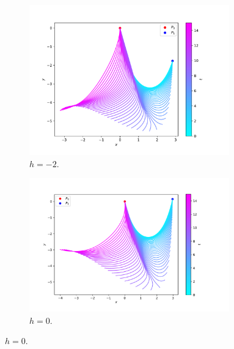 \documentclass[a4paper, 12pt, slovene]{article}
\numberwithin{equation}{section}
\begin{document}
\begin{figure}[H]
\centering
\begin{subfigure}{0.475\textwidth}
	\centering
	\includegraphics[width=0.95\textwidth]{grafi/falling_chain_P.3.0--2.0_L.6_n.50_t.15_r.0.0005_m.0.2_g.1_dt.0.01_freq.25.pdf}
	\caption{$h = -2$.}
	\label{f:ver--2}
\end{subfigure}
\begin{subfigure}{0.515\textwidth}
	\centering
	\includegraphics[width=0.95\textwidth]{grafi/falling_chain_P.3.0-0.0_L.6_n.48_t.15_r.0.0005_m.0.2_g.1_dt.0.01_freq.25.pdf}
	\caption{$h = 0$.}
	\label{f:ver-0}
\end{subfigure}
\end{figure}
\end{document}
